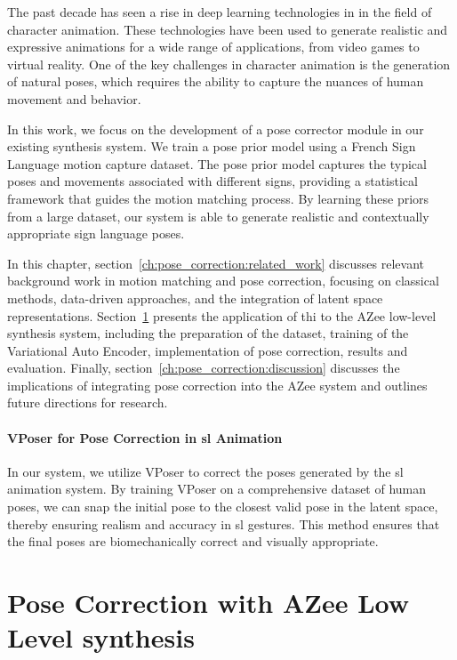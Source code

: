 \documentclass[../../main.tex]{subfiles}
\begin{document}
The past decade has seen a rise in deep learning technologies in in the field of character animation. These technologies have been used to generate realistic and expressive animations for a wide range of applications, from video games to virtual reality. One of the key challenges in character animation is the generation of natural poses, which requires the ability to capture the nuances of human movement and behavior. 

In this work, we focus on the development of a pose corrector module in our existing synthesis system. We train a pose prior model using a French Sign Language motion capture dataset. The pose prior model captures the typical poses and movements associated with different signs, providing a statistical framework that guides the motion matching process. By learning these priors from a large dataset, our system is able to generate realistic and contextually appropriate sign language poses.

In this chapter, section~\ref{ch:pose_correction:related_work} discusses relevant background work in motion matching and pose correction, focusing on classical methods, data-driven approaches, and the integration of latent space representations. Section~\ref{ch:pose_correction:pose_correction_with_azee} presents the application of thi to the AZee low-level synthesis system, including the preparation of the dataset, training of the Variational Auto Encoder, implementation of pose correction, results and evaluation. Finally, section~\ref{ch:pose_correction:discussion} discusses the implications of integrating pose correction into the AZee system and outlines future directions for research.

\paragraph{VPoser for Pose Correction in \gls{sl} Animation} In our system, we utilize VPoser to correct the poses generated by the \gls{sl} animation system. By training VPoser on a comprehensive dataset of human poses, we can snap the initial pose to the closest valid pose in the latent space, thereby ensuring realism and accuracy in \gls{sl} gestures. This method ensures that the final poses are biomechanically correct and visually appropriate.

\section{Pose Correction with AZee Low Level synthesis}
\label{ch:pose_correction:pose_correction_with_azee}
\end{document}
